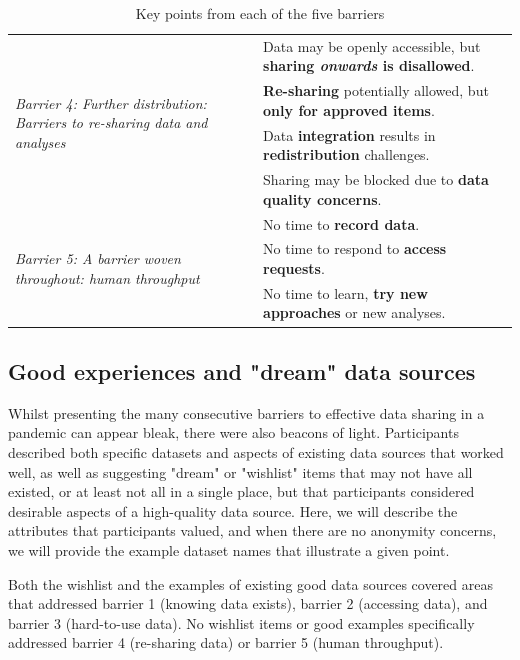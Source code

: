 \documentclass{CUP-JNL-DAP}%
\begin{document}
\begin{table}
\begin{tabular}{ | l | l| }
         \hline
         
          \multirow{4}{10em}{\textit{Barrier 4: Further distribution: Barriers to re-sharing data and analyses}} 
         & Data may be openly accessible, but \textbf{sharing \textit{onwards} is disallowed}.\\
         & \textbf{Re-sharing} potentially allowed, but \textbf{only for approved items}. \\
         & Data \textbf{integration} results in \textbf{redistribution} challenges.\\
         & Sharing may be blocked due to \textbf{data quality concerns}. \\
         
         \hline
         \multirow{3}{10em}{\textit{Barrier 5: A barrier woven throughout: human throughput}} 
         & No time to \textbf{record data}. \\
         & No time to respond to \textbf{access requests}.\\
         & No time to learn, \textbf{try new approaches} or new analyses.\\
         \hline
    \end{tabular}
    \caption{Key points from each of the five barriers}
    \label{tab:barriers-summary}
\end{table}

\subsection{Good experiences and "dream" data sources}
Whilst presenting the many consecutive barriers to effective data sharing in a pandemic can appear bleak, there were also beacons of light. Participants described both specific datasets and aspects of existing data sources that worked well, as well as suggesting "dream" or "wishlist" items that may not have all existed, or at least not all in a single place, but that participants considered desirable aspects of a high-quality data source. Here, we will describe the attributes that participants valued,  and when there are no anonymity concerns, we will provide the example dataset names that illustrate a given point. 

Both the wishlist and the examples of existing good data sources covered areas that addressed barrier 1 (knowing data exists), barrier 2 (accessing data), and barrier 3 (hard-to-use data). No wishlist items or good examples specifically addressed barrier 4 (re-sharing data) or barrier 5 (human throughput). 
\end{document}
